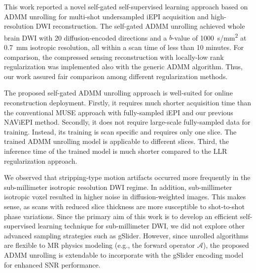 \documentclass[AMA,STIX2COL,Linenumberson]{MRM}
\begin{document}
This work reported a novel self-gated self-supervised learning approach
based on ADMM unrolling
for multi-shot undersampled iEPI acquisition and high-resolution DWI reconstruction.
The self-gated ADMM unrolling achieved whole brain DWI
with 20 diffusion-encoded directions and a $b$-value of \SI{1000}{s/mm^2}
at \SI{0.7}{mm} isotropic resolution,
all within a scan time of less than 10 minutes.
For comparison, the compressed sensing reconstruction with
locally-low rank regularization was implemented also with the generic ADMM algorithm.
Thus, our work assured fair comparison among different regularization methods.

The proposed self-gated ADMM unrolling approach is well-suited
for online reconstruction deployment.
Firstly, it requires much shorter acquisition time than
the conventional MUSE approach with fully-sampled iEPI and
our previous NAViEPI method.
Secondly, it does not require large-scale fully-sampled data for training.
Instead, its training is scan specific and requires only one slice.
The trained ADMM unrolling model is applicable to different slices.
Third, the inference time of the trained model is much
shorter compared to the LLR regularization approach.

We observed that stripping-type motion artifacts occurred more frequently
in the sub-millimeter isotropic resolution DWI regime.
In addition, sub-millimeter isotropic voxel
resulted in higher noise in diffusion-weighted images.
This makes sense, as scans with reduced slice thickness are more susceptible to
shot-to-shot phase variations.
Since the primary aim of this work is to develop an efficient self-supervised learning
technique for sub-millimeter DWI, we did not explore other advanced sampling strategies 
such as gSlider. 
However, since unrolled algorithms are flexible to
MR physics modeling (e.g., the forward operator $\mathcal{A}$),
the proposed ADMM unrolling is extendable
to incorporate with the gSlider encoding model for enhanced SNR performance.
\end{document}
